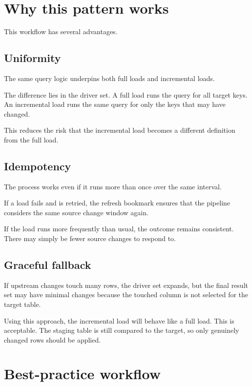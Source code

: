 \documentclass[10pt,openany,10pt]{book}
\begin{document}
\section{Why this pattern works}\label{why-this-pattern-works}

This workflow has several advantages.

\subsection{Uniformity}\label{uniformity}

The same query logic underpins both full loads and incremental loads.

The difference lies in the driver set. A full load runs the query for
all target keys. An incremental load runs the same query for only the
keys that may have changed.

This reduces the risk that the incremental load becomes a different
definition from the full load.

\subsection{Idempotency}\label{idempotency}

The process works even if it runs more than once over the same interval.

If a load fails and is retried, the refresh bookmark ensures that the
pipeline considers the same source change window again.

If the load runs more frequently than usual, the outcome remains
consistent. There may simply be fewer source changes to respond to.

\subsection{Graceful fallback}\label{graceful-fallback}

If upstream changes touch many rows, the driver set expands, but the
final result set may have minimal changes because the touched column is
not selected for the target table.

Using this approach, the incremental load will behave like a full load.
This is acceptable. The staging table is still compared to the target,
so only genuinely changed rows should be applied.

\section{Best-practice workflow}\label{best-practice-workflow}
\end{document}
